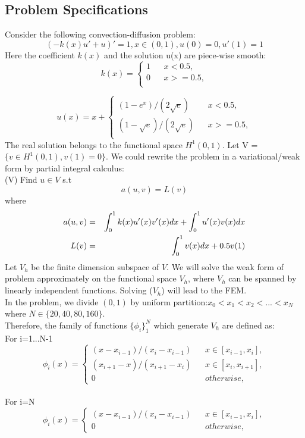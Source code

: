 \documentclass[a4paper,12pt]{article}
\begin{document}
\subsection{Problem Specifications}
Consider the following convection-diffusion problem:
$$(-k(x)u'+u)'=1,  x \in (0,1), u(0)=0, u'(1)=1$$
Here the coefficient $k(x)$ and the solution u(x) are piece-wise smooth:
$$
k(x)=\left\{
\begin{array}{rcl}
1& & x<0.5, \\
0& & x>=0.5,\\
\end{array} \right.
$$

$$
u(x)=x + \left\{
\begin{array}{rcl}
(1-e^{x})/(2\sqrt{e})& & x<0.5, \\
(1-\sqrt{e})/(2\sqrt{e})& & x>=0.5,\\
\end{array} \right.
$$
The real solution belongs to the functional space $H^1(0,1)$.
Let V = $\{v\in H^1(0,1), v(1)=0\}$. We could rewrite the problem in a variational/weak form by partial integral calculus:
\\(V) Find $u \in V$ s.t \\
$$a(u,v)=L(v)$$
where
\begin{eqnarray}
a(u,v) &=& \int_0^1k(x)u'(x)v'(x)dx + \int_0^1u'(x)v(x)dx \notag \\
L(v) &=& \int_0^1v(x)dx + 0.5v(1)
\end{eqnarray}
Let $V_h$ be the finite dimension subspace of $V$. We will solve the weak form of problem approximately on the functional space $V_h$, where $V_h$ can be spanned by linearly independent functions. Solving ($V_h$) will lead to the FEM.\\
In the problem, we divide $(0,1)$ by uniform partition:$x_0<x_1<x_2<...<x_N$ where $N \in \{20,40,80,160\}$.\\
Therefore, the family of functions $\{\phi_i\}_1^N$ which generate $V_h$ are defined as:
\\For i=1...N-1
$$
\phi_i(x)=\left\{
\begin{array}{rcl}
(x-x_{i-1})/(x_i-x_{i-1})& & x\in[x_{i-1},x_{i}], \\
(x_{i+1}-x)/(x_{i+1}-x_{i})& & x\in[x_{i},x_{i+1}],\\
0 & & otherwise,
\end{array} \right.
$$
\\For i=N
$$
\phi_i(x)=\left\{
\begin{array}{rcl}
(x-x_{i-1})/(x_i-x_{i-1})& & x\in[x_{i-1},x_{i}], \\
0 & & otherwise,
\end{array} \right.
$$
\end{document}
